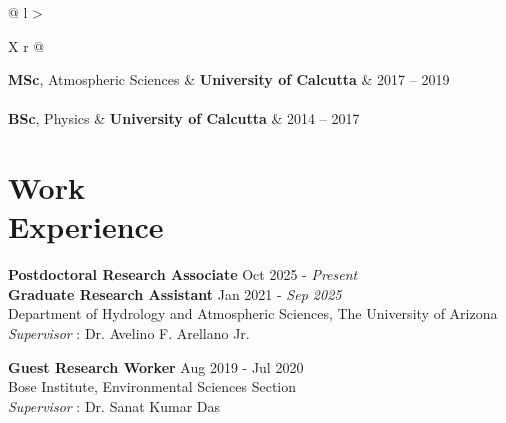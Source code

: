 \documentclass[margin,line]{resume}
\begin{document}
\begin{resume}
\begin{tabularx}{\linewidth}{@{} l >{\raggedright\arraybackslash}X r @{}}
			\textbf{MSc}, Atmospheric Sciences & \textbf{University of Calcutta} & 2017 -- 2019 \\
			 \\[1.5ex]
			
			\textbf{BSc}, Physics & \textbf{University of Calcutta} & 2014 -- 2017 \\
		\end{tabularx}
		
		\vspace*{-3mm}
		
		\section{\mysidestyle \textbf{\textcolor{sep}{Work \\Experience}}}
		
		\textbf{Postdoctoral Research Associate} \hfill Oct 2025 - \textit{Present} \\
		\textbf{Graduate Research Assistant} \hfill Jan 2021 - \textit{Sep 2025}  \\
		Department of Hydrology and Atmospheric Sciences, The University of Arizona \\
		\textit{ Supervisor} : Dr. Avelino F. Arellano Jr.
		
		\textbf{Guest Research Worker} \hfill Aug 2019 - Jul 2020 \\
		Bose Institute, Environmental Sciences Section \\
		\textit{Supervisor} : Dr. Sanat Kumar Das 
		

\end{resume}
\end{document}
